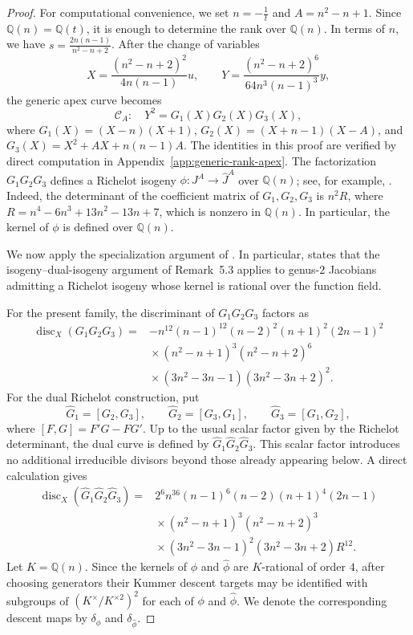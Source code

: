 \documentclass[11pt]{amsart}
\theoremstyle{plain}
\theoremstyle{remark}
\theoremstyle{plain}
\newcommand{\Q}{\mathbb{Q}}
\begin{document}
\begin{proof}
For computational convenience, we set
$n=-\frac1t$ and $A=n^2-n+1$.
Since $\Q(n)=\Q(t)$, it is enough to determine the rank over $\Q(n)$.
In terms of $n$, we have
$s=\frac{2n(n-1)}{n^2-n+2}$.
After the change of variables
\[
X=\frac{(n^2-n+2)^2}{4n(n-1)}u,
\qquad
Y=\frac{(n^2-n+2)^6}{64n^3(n-1)^3}y,
\]
the generic apex curve becomes
\[
\mathcal C_A\colon\quad
Y^2=G_1(X)G_2(X)G_3(X),
\]
where
$G_1(X)=(X-n)(X+1)$,
$G_2(X)=(X+n-1)(X-A)$,
and
$G_3(X)=X^2+AX+n(n-1)A$.
The identities in this proof are verified by direct computation in
Appendix~\ref{app:generic-rank-apex}.
The factorization $G_1G_2G_3$ defines a Richelot isogeny $\phi\colon J^A\longrightarrow \widehat J^A$
over $\Q(n)$; see, for example, \cite[Section~4]{BruinDoerksen}.
Indeed, the determinant of the coefficient matrix of
$G_1,G_2,G_3$ is
$n^2R$,
where
$R=n^4-6n^3+13n^2-13n+7$,
which is nonzero in $\Q(n)$. In particular, the kernel of $\phi$ is
defined over $\Q(n)$.

We now apply the specialization argument of
\cite[Section~5]{Stoll2019}. In particular,
\cite[Remark~5.4]{Stoll2019} states that the isogeny--dual-isogeny
argument of Remark~5.3 applies to genus-$2$ Jacobians admitting a
Richelot isogeny whose kernel is rational over the function field.

For the present family, the discriminant of $G_1G_2G_3$ factors as
\[
\begin{aligned}
\operatorname{disc}_X(G_1G_2G_3)
={}&-n^{12}(n-1)^{12}(n-2)^2(n+1)^2(2n-1)^2\\
&{}\times(n^2-n+1)^3(n^2-n+2)^6\\
&{}\times(3n^2-3n-1)(3n^2-3n+2)^2.
\end{aligned}
\]
For the dual Richelot construction, put
\[
\widehat G_1=[G_2,G_3],
\qquad
\widehat G_2=[G_3,G_1],
\qquad
\widehat G_3=[G_1,G_2],
\]
where
$[F,G]=F'G-FG'$.
Up to the usual scalar factor given by the Richelot determinant, the
dual curve is defined by
$\widehat G_1\widehat G_2\widehat G_3$.
This scalar factor introduces no additional irreducible divisors beyond
those already appearing below. A direct calculation gives
\[
\begin{aligned}
\operatorname{disc}_X
(\widehat G_1\widehat G_2\widehat G_3)
={}&2^6n^{36}(n-1)^6(n-2)(n+1)^4(2n-1)\\
&{}\times(n^2-n+1)^3(n^2-n+2)^3\\
&{}\times(3n^2-3n-1)^2(3n^2-3n+2)R^{12}.
\end{aligned}
\]
Let $K=\Q(n)$. Since the kernels of $\phi$ and $\widehat\phi$
are $K$-rational of order $4$, after choosing generators their
Kummer descent targets may be identified with subgroups of
$(K^\times/K^{\times2})^2$
for each of $\phi$ and $\widehat\phi$. We denote the corresponding
descent maps by $\delta_\phi$ and $\delta_{\widehat\phi}$.


\end{proof}
\end{document}
